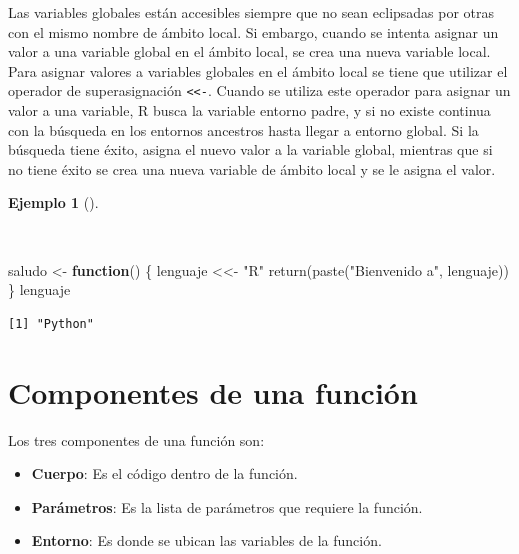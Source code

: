 \documentclass[
  a4paper,
]{scrreport}
\newenvironment{Shaded}{\begin{snugshade}}{\end{snugshade}}
\newcommand{\ControlFlowTok}[1]{\textcolor[rgb]{0.00,0.23,0.31}{\textbf{#1}}}
\newcommand{\FunctionTok}[1]{\textcolor[rgb]{0.28,0.35,0.67}{#1}}
\newcommand{\NormalTok}[1]{\textcolor[rgb]{0.00,0.23,0.31}{#1}}
\newcommand{\OtherTok}[1]{\textcolor[rgb]{0.00,0.23,0.31}{#1}}
\newcommand{\StringTok}[1]{\textcolor[rgb]{0.13,0.47,0.30}{#1}}
\providecommand{\tightlist}{%
  \setlength{\itemsep}{0pt}\setlength{\parskip}{0pt}}\usepackage{longtable,booktabs,array}
\theoremstyle{definition}
\theoremstyle{definition}
\newtheorem{example}{Ejemplo}[chapter]
\theoremstyle{remark}
\begin{document}
Las variables globales están accesibles siempre que no sean eclipsadas
por otras con el mismo nombre de ámbito local. Si embargo, cuando se
intenta asignar un valor a una variable global en el ámbito local, se
crea una nueva variable local. Para asignar valores a variables globales
en el ámbito local se tiene que utilizar el operador de superasignación
\texttt{\textless{}\textless{}-}. Cuando se utiliza este operador para
asignar un valor a una variable, R busca la variable entorno padre, y si
no existe continua con la búsqueda en los entornos ancestros hasta
llegar a entorno global. Si la búsqueda tiene éxito, asigna el nuevo
valor a la variable global, mientras que si no tiene éxito se crea una
nueva variable de ámbito local y se le asigna el valor.

\begin{example}[]\protect\hypertarget{exm-superasignacion}{}\label{exm-superasignacion}

~

\begin{Shaded}
\begin{Highlighting}[]
\NormalTok{saludo }\OtherTok{\textless{}{-}} \ControlFlowTok{function}\NormalTok{() \{}
\NormalTok{  lenguaje }\OtherTok{\textless{}\textless{}{-}} \StringTok{"R"}
  \FunctionTok{return}\NormalTok{(}\FunctionTok{paste}\NormalTok{(}\StringTok{"Bienvenido a"}\NormalTok{, lenguaje))}
\NormalTok{\}}
\NormalTok{lenguaje}
\end{Highlighting}
\end{Shaded}

\begin{verbatim}
[1] "Python"
\end{verbatim}

\end{example}

\section{Componentes de una
función}\label{componentes-de-una-funciuxf3n}

Los tres componentes de una función son:

\begin{itemize}
\tightlist
\item
  \textbf{Cuerpo}: Es el código dentro de la función.
\item
  \textbf{Parámetros}: Es la lista de parámetros que requiere la
  función.
\item
  \textbf{Entorno}: Es donde se ubican las variables de la función.
\end{itemize}
\end{document}
